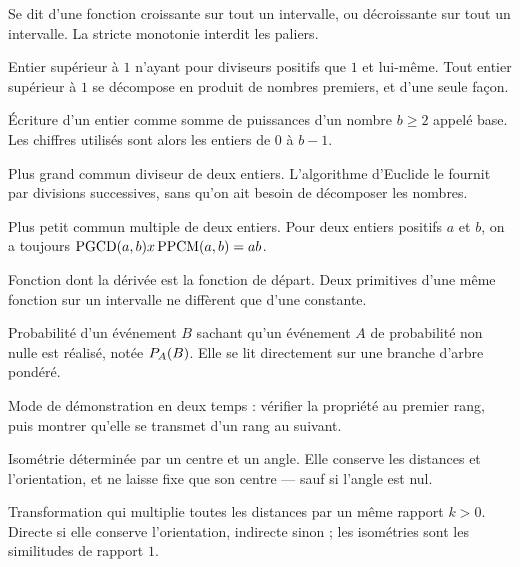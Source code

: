 Se dit d'une fonction croissante sur tout un intervalle, ou décroissante sur
tout un intervalle. La stricte monotonie interdit les paliers.


Entier supérieur à $1$ n'ayant pour diviseurs positifs que $1$ et lui-même.
Tout entier supérieur à $1$ se décompose en produit de nombres premiers, et
d'une seule façon.

Écriture d'un entier comme somme de puissances d'un nombre $b \geq 2$ appelé
base. Les chiffres utilisés sont alors les entiers de $0$ à $b-1$.


Plus grand commun diviseur de deux entiers. L'algorithme d'Euclide le fournit
par divisions successives, sans qu'on ait besoin de décomposer les nombres.

Plus petit commun multiple de deux entiers. Pour deux entiers positifs $a$ et
$b$, on a toujours $\pgcd(a,b) \times \ppcm(a,b) = ab$.

Fonction dont la dérivée est la fonction de départ. Deux primitives d'une même
fonction sur un intervalle ne diffèrent que d'une constante.

Probabilité d'un événement $B$ sachant qu'un événement $A$ de probabilité non
nulle est réalisé, notée $\probacond BA$. Elle se lit directement sur une
branche d'arbre pondéré.


Mode de démonstration en deux temps : vérifier la propriété au premier rang,
puis montrer qu'elle se transmet d'un rang au suivant.

Isométrie déterminée par un centre et un angle. Elle conserve les distances et
l'orientation, et ne laisse fixe que son centre — sauf si l'angle est nul.


Transformation qui multiplie toutes les distances par un même rapport $k>0$.
Directe si elle conserve l'orientation, indirecte sinon ; les isométries sont
les similitudes de rapport $1$.

